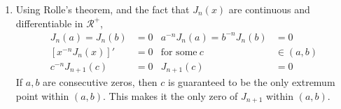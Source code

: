 \begin{enumerate}
    \item Using Rolle's theorem, and the fact that $ J_n(x) $ are continuous and
          differentiable in $ \mathcal{R^+} $,
          \begin{align}
              J_n(a) = J_n(b)             & = 0       &
              a^{-n}J_n(a) = b^{-n}J_n(b) & = 0         \\
              [x^{-n}J_n(x)]'             & = 0       &
              \text{for some}\ c          & \in (a,b)   \\
              c^{-n}J_{n+1}(c)            & = 0       &
              J_{n+1}(c)                  & = 0
          \end{align}
          If $ a,b $ are consecutive zeros, then $ c $ is guaranteed to be the only
          extremum point within $ (a,b) $. This makes it the only zero of $ J_{n+1} $
          within $ (a,b) $.


\end{enumerate}
